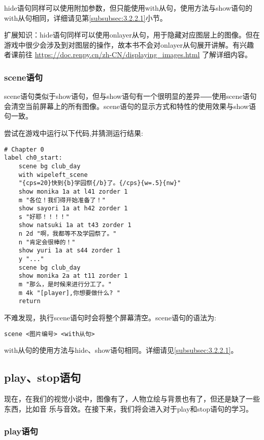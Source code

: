 hide语句同样可以使用附加参数，但只能使用with从句，使用方法与show语句的with从句相同，详细请见第\ref{subsubsec:3.2.2.1}小节。

\begin{ExtraKnowledge}
    扩展知识：hide语句同样可以使用onlayer从句，用于隐藏对应图层上的图像。但在游戏中很少会涉及到对图层的操作，故本书不会对onlayer从句展开讲解。有兴趣者课前往 \url{https://doc.renpy.cn/zh-CN/displaying_images.html} 了解详细内容。
\end{ExtraKnowledge}

\subsubsection{scene语句}
\label{subsubsec:3.2.2.3}

scene语句类似于show语句，但与show语句有一个很明显的差异⸺使用scene语句会清空当前屏幕上的所有图像。scene语句的显示方式和特性的使用效果与show语句一致。

尝试在游戏中运行以下代码,并猜测运行结果:
\begin{lstlisting}[caption=script-ch1.rpy]
# Chapter 0
label ch0_start:
    scene bg club_day
    with wipeleft_scene
    "{cps=20}快到{b}学园祭{/b}了。{/cps}{w=.5}{nw}"
    show monika 1a at l41 zorder 1
    m "各位！我们得开始准备了！"
    show sayori 1a at h42 zorder 1
    s "好耶！！！！"
    show natsuki 1a at t43 zorder 1
    n 2d "啊，我都等不及学园祭了。"
    n "肯定会很棒的！"
    show yuri 1a at s44 zorder 1
    y "..."
    scene bg club_day
    show monika 2a at t11 zorder 1
    m "那么，是时候来进行分工了。"
    m 4k "[player],你想要做什么? "
    return
\end{lstlisting}

不难发现，执行scene语句时会将整个屏幕清空。scene语句的语法为:

\begin{lstlisting}[numbers=none]
scene <图片编号> <with从句>
\end{lstlisting}

with从句的使用方法与hide、show语句相同。详细请见\ref{subsubsec:3.2.2.1}。

\subsection{play、stop语句}
现在，在我们的视觉小说中，图像有了，人物立绘与背景也有了，但还是缺了一些东西，比如音
乐与音效。在接下来，我们将会进入对于play和stop语句的学习。

\subsubsection{play语句}

